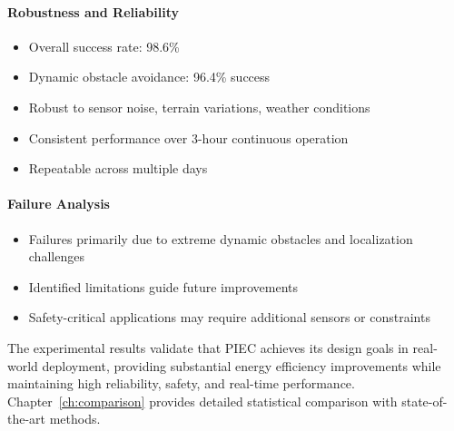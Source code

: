 \paragraph{Robustness and Reliability}
\begin{itemize}
    \item Overall success rate: 98.6\%
    \item Dynamic obstacle avoidance: 96.4\% success
    \item Robust to sensor noise, terrain variations, weather conditions
    \item Consistent performance over 3-hour continuous operation
    \item Repeatable across multiple days
\end{itemize}

\paragraph{Failure Analysis}
\begin{itemize}
    \item Failures primarily due to extreme dynamic obstacles and localization challenges
    \item Identified limitations guide future improvements
    \item Safety-critical applications may require additional sensors or constraints
\end{itemize}

The experimental results validate that PIEC achieves its design goals in real-world deployment, providing substantial energy efficiency improvements while maintaining high reliability, safety, and real-time performance. Chapter~\ref{ch:comparison} provides detailed statistical comparison with state-of-the-art methods.
